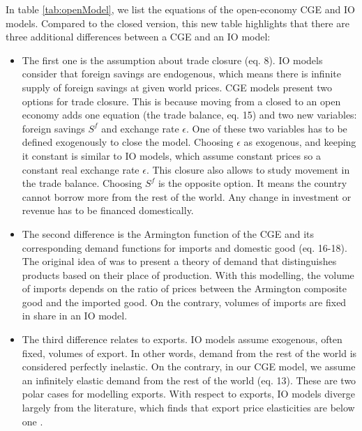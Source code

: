 In table  \ref{tab:openModel}, we list the equations of the open-economy CGE and IO models.
Compared to the closed version, this new table highlights that there are three additional differences between a CGE and an IO model: 
\begin{itemize}
	\item The first one is the assumption about trade closure (eq. 8). IO models consider that foreign savings are endogenous, which means there is infinite supply of foreign savings at given world prices. CGE models present two options for trade closure. This is because moving from a closed to an open economy adds one equation (the trade balance, eq. 15) and two new variables: foreign savings $S^f$ and exchange rate $\epsilon$. One of these two variables has to be defined exogenously to close the model. Choosing $\epsilon$ as exogenous, and keeping it constant is similar to IO models, which assume constant prices so a constant real exchange rate $\epsilon$. This closure also allows to study movement in the trade balance. Choosing $S^f$ is the opposite option. It means the country cannot borrow more from the rest of the world. Any change in investment or revenue has to be financed domestically.
	
	\item The second difference is the Armington function of the CGE and its corresponding demand functions for imports and domestic good (eq. 16-18). 
	The original idea of \citet{Armington1969} was to present a theory of demand that distinguishes products based on their place of production. 
	With this modelling, the volume of imports depends on the ratio of prices between the Armington composite good and the imported good. On the contrary, volumes of imports are fixed in share in an IO model. 
	
	\item The third difference relates to exports. IO models assume exogenous, often fixed, volumes of export. In other words, demand from the rest of the world is considered perfectly inelastic. On the contrary, in our CGE model, we assume an infinitely elastic demand from the rest of the world (eq. 13). These are two polar cases for modelling exports. With respect to exports, IO models diverge largely from the literature, which finds that export price elasticities are below one \citep{Ducoudre2014}.
\end{itemize}

